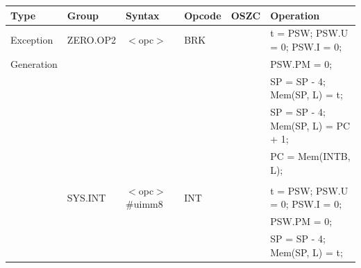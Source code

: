 \begin{table}
\begin{subtable}{\linewidth}
\begin{center}
\scriptsize
\begin{tabular}{llllll}
\hline
Type               & Group             & Syntax                                & Opcode            & OSZC              & Operation                                                                     \\ \hline
Exception          & ZERO.OP2          & $<$opc$>$                             & BRK               & \flags{----}      & t = PSW; PSW.U = 0; PSW.I = 0;                                                \\
Generation         &                   &                                       &                   &                   & PSW.PM = 0;                                                                   \\
                   &                   &                                       &                   &                   & SP = SP - 4; Mem(SP, L) = t;                                                  \\
                   &                   &                                       &                   &                   & SP = SP - 4; Mem(SP, L) = PC + 1;                                             \\
                   &                   &                                       &                   &                   & PC = Mem(INTB, L);                                                            \\
                   &                   &                                       &                   &                   &                                                                               \\
                   & SYS.INT           & $<$opc$>$ \#uimm8                     & INT               & \flags{----}      & t = PSW; PSW.U = 0; PSW.I = 0;                                                \\
                   &                   &                                       &                   &                   & PSW.PM = 0;                                                                   \\
                   &                   &                                       &                   &                   & SP = SP - 4; Mem(SP, L) = t;                                                  \\

\end{tabular}
\end{center}
\end{subtable}
\end{table}
